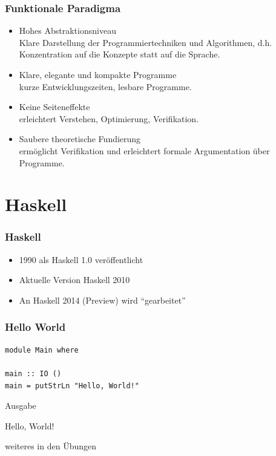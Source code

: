 \begin{frame}
\frametitle{Funktionale Paradigma}
\begin{block}{\vspace*{-3ex}}
\begin{itemize}
  \item Hohes Abstraktionsniveau \\ 
  Klare Darstellung der Programmiertechniken und Algorithmen,
d.h. Konzentration auf die Konzepte statt auf die Sprache.
  \item Klare, elegante und kompakte Programme \\ 
  kurze Entwicklungszeiten, lesbare Programme.
  \item Keine Seiteneffekte \\ 
  erleichtert Verstehen, Optimierung, Verifikation.
  \item Saubere theoretische Fundierung \\ 
  ermöglicht Verifikation und erleichtert formale Argumentation über Programme.
\end{itemize}
\end{block}
\end{frame}

\section{Haskell}
\begin{frame}
\frametitle{Haskell}
\begin{block}{\vspace*{-3ex}}
\begin{itemize}
  \item 1990 als Haskell 1.0 veröffentlicht
  \item Aktuelle Version Haskell 2010
  \item An Haskell 2014 (Preview) wird "`gearbeitet"'
\end{itemize}
\end{block}
\end{frame}

\begin{frame}[fragile]
\frametitle{Hello World} 
\begin{lstlisting}
module Main where
 
main :: IO ()
main = putStrLn "Hello, World!"
\end{lstlisting}
\pause
\begin{block}{Ausgabe}
\begin{center}
Hello, World!
\end{center}
\end{block}
\pause
\begin{center}
weiteres in den Übungen
\end{center}
\end{frame}

